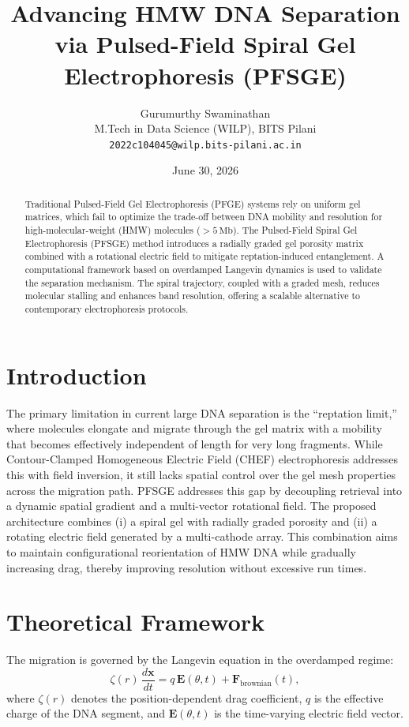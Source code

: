 \documentclass[twocolumn,11pt,a4paper]{article}
\title{Advancing HMW DNA Separation via Pulsed-Field Spiral Gel Electrophoresis (PFSGE)}
\author{Gurumurthy Swaminathan\\
M.Tech in Data Science (WILP), BITS Pilani\\
\texttt{2022c104045@wilp.bits-pilani.ac.in}}
\date{June 30, 2026}
\begin{document}
\maketitle

\begin{abstract}
Traditional Pulsed-Field Gel Electrophoresis (PFGE) systems rely on uniform gel matrices, which fail to optimize the trade-off between DNA mobility and resolution for high-molecular-weight (HMW) molecules (\(> 5\,\mathrm{Mb}\)). The Pulsed-Field Spiral Gel Electrophoresis (PFSGE) method introduces a radially graded gel porosity matrix combined with a rotational electric field to mitigate reptation-induced entanglement. A computational framework based on overdamped Langevin dynamics is used to validate the separation mechanism. The spiral trajectory, coupled with a graded mesh, reduces molecular stalling and enhances band resolution, offering a scalable alternative to contemporary electrophoresis protocols.
\end{abstract}

\section{Introduction}

The primary limitation in current large DNA separation is the ``reptation limit,'' where molecules elongate and migrate through the gel matrix with a mobility that becomes effectively independent of length for very long fragments. \cite{SchwartzCantor1984, Viovy2000, PFGE1988}
While Contour-Clamped Homogeneous Electric Field (CHEF) electrophoresis addresses this with field inversion, it still lacks spatial control over the gel mesh properties across the migration path. \cite{SchwartzCantor1984, Smith1989}
PFSGE addresses this gap by decoupling retrieval into a dynamic spatial gradient and a multi-vector rotational field. The proposed architecture combines (i) a spiral gel with radially graded porosity and (ii) a rotating electric field generated by a multi-cathode array. This combination aims to maintain configurational reorientation of HMW DNA while gradually increasing drag, thereby improving resolution without excessive run times. \cite{GradientGel1992, DoiEdwards1986}

\section{Theoretical Framework}

The migration is governed by the Langevin equation in the overdamped regime:
\begin{equation}
\zeta(r)\,\frac{d\mathbf{x}}{dt}
=
q\,\mathbf{E}(\theta,t)
+
\mathbf{F}_{\mathrm{brownian}}(t),
\label{eq:langevin}
\end{equation}
where \(\zeta(r)\) denotes the position-dependent drag coefficient, \(q\) is the effective charge of the DNA segment, and \(\mathbf{E}(\theta,t)\) is the time-varying electric field vector. \cite{Viovy2000, DoiEdwards1986}
\end{document}
